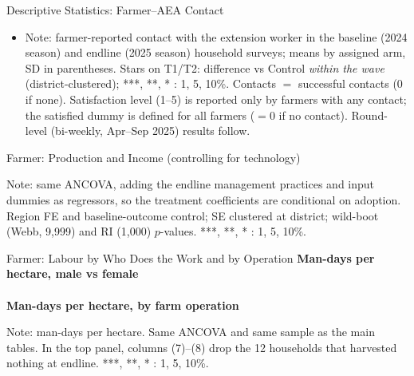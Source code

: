 \documentclass[aspectratio=169]{beamer}
\newcommand{\notefont}{\fontsize{5pt}{6pt}\selectfont}
\begin{document}
\begin{frame}{Descriptive Statistics: Farmer--AEA Contact}
	\centering
	\begin{itemize}\notefont
		\item Note: farmer-reported contact with the extension worker in the baseline (2024
		season) and endline (2025 season) household surveys; means by assigned arm, SD in
		parentheses. Stars on T1/T2: difference vs Control \emph{within the wave}
		(district-clustered); ***, **, * : 1, 5, 10\%. Contacts $=$ successful contacts
		($0$ if none). Satisfaction level (1--5) is reported only by farmers with any
		contact; the satisfied dummy is defined for all farmers ($=0$ if no contact).
		Round-level (bi-weekly, Apr--Sep 2025) results follow.
	\end{itemize}
\end{frame}

\begin{frame}{Farmer: Production and Income (controlling for technology)}
	\centering
	\begin{minipage}{0.94\textwidth}
		\notefont
		Note: same ANCOVA, adding the endline management
		practices and input dummies as regressors, so the treatment coefficients are conditional on adoption. Region FE and baseline-outcome control; SE clustered at district; wild-boot (Webb, 9{,}999) and RI (1{,}000) $p$-values. ***, **, * : 1, 5, 10\%.
	\end{minipage}
\end{frame}

\begin{frame}{Farmer: Labour by Who Does the Work and by Operation}
	\centering
	{\notefont\textbf{Man-days per hectare, male vs female}}\\[1pt]
	\\[4pt]
	{\notefont\textbf{Man-days per hectare, by farm operation}}\\[1pt]
	\begin{minipage}{0.94\textwidth}
		\notefont
		Note: man-days per hectare. Same ANCOVA and same sample as the main tables. In the top panel, columns (7)--(8) drop the 12 households that harvested nothing at endline. 
		***, **, * : 1, 5, 10\%.
	\end{minipage}
\end{frame}
\end{document}
